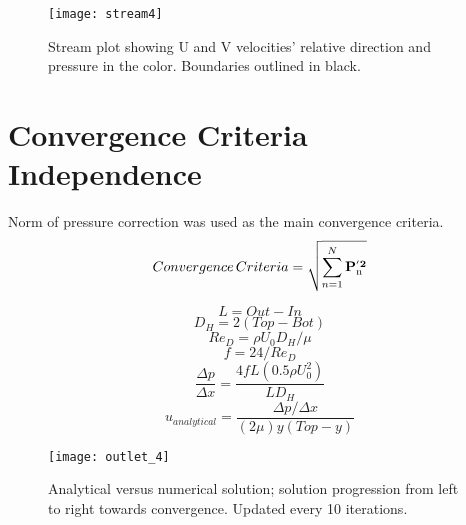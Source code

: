 \documentclass[10pt,english]{article}
\begin{document}
\begin{figure}[htbp]
\centering
\texttt{[image: stream4]}
\vspace{-5pt}
\caption{Stream plot showing U and V velocities' relative direction and pressure in the color. Boundaries outlined in black.}
\label{f:3b}
\end{figure}




\FloatBarrier
\section{Convergence Criteria Independence}



\noindent Norm of pressure correction was used as the main convergence criteria.
    \begin{equation}
      Convergence\,Criteria = \sqrt{\sum_{n=1}^N \bf P_{\rm n}^{'2}}
    \end{equation}

\begin{equation}
            L = Out-In
\end{equation}
\begin{equation}
            D_H = 2 (Top-Bot)
            \end{equation}
            \begin{equation}
            Re_D = \rho U_0 D_H / \mu
            \end{equation}
            \begin{equation}
            f = 24/Re_D
            \end{equation}
            \begin{equation}
            \frac{\Delta p}{\Delta x} = \frac{4 f L (0.5 \rho U_0^2)}{L D_H}
            \end{equation}
            \begin{equation}
            u_{analytical} = \frac{{\Delta p}/{\Delta x}}{(2 \mu) y (Top-y)}
            \end{equation}
      
\begin{figure}[htbp]
\centering
\texttt{[image: outlet\_4]}
\vspace{-5pt}
\caption{Analytical versus numerical solution; solution progression from left to right towards convergence.  Updated every 10 iterations.}
\label{f:3b}
\end{figure}
\end{document}
